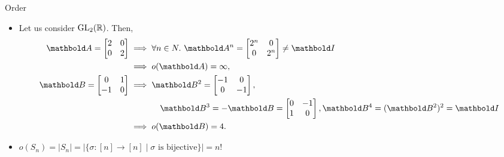 \begin{ex}{Order}{}
\begin{itemize}
    \item Let us consider $\mathrm{GL}_{2}(\mathbb{R})$. Then, \begin{align*}
        \mA = \begin{bmatrix}
            2 & 0 \\
            0 & 2 \\
        \end{bmatrix} &\implies \forall n \in N.\ \mA^n = \begin{bmatrix}
            2^n & 0 \\
            0 & 2^n \\
        \end{bmatrix} \neq \mI \\ &\implies o(\mA) = \infty, \\
        \mB = \begin{bmatrix}
            0 & 1 \\
            -1 & 0 \\
        \end{bmatrix} &\implies \begin{multlined}[t]\mB^2 = \begin{bmatrix}
            -1 & 0 \\
            0 & -1 \\
        \end{bmatrix}, \\ \mB^3 = -\mB = \begin{bmatrix}
            0 & -1 \\
            1 & 0 \\
        \end{bmatrix}, \mB^4 = (\mB^2)^2 = \mI\end{multlined} \\ &\implies o(\mB) = 4.
    \end{align*}
    
    \item $o(S_n) = |S_n| = |\{\sigma : [n] \to [n] \mid \text{$\sigma$ is bijective}\}| = n!$
\end{itemize}
\end{ex}

